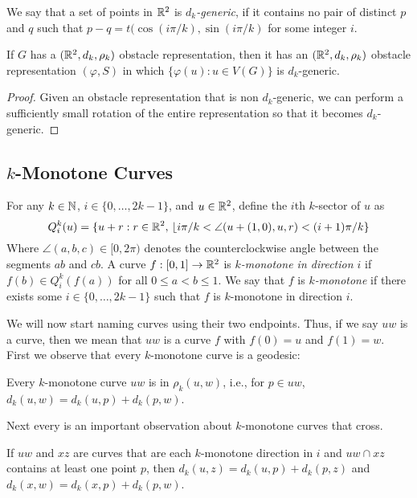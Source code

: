 \documentclass{patmorin}
\begin{document}
We say that a set of points in $\mathbb{R}^2$ is \emph{$d_k$-generic},
if it contains no pair of distinct $p$ and $q$ such that $p-q=
t(\cos(i\pi/k),\sin(i\pi/k)$ for some integer $i$.

\begin{obs}
  If $G$ has a $(\mathbb{R}^2,d_k,\rho_k)$ obstacle representation, then it
  has an $(\mathbb{R}^2,d_k,\rho_k)$ obstacle representation $(\varphi, S)$
  in which $\{\varphi(u):u\in V(G)\}$ is $d_k$-generic.
\end{obs}

\begin{proof}
   Given an obstacle representation that is non $d_k$-generic, we can
   perform a sufficiently small rotation of the entire representation
   so that it becomes $d_k$-generic.
\end{proof}



\subsection{$k$-Monotone Curves}

For any $k\in\mathbb{N}$, $i\in\{0,\ldots,2k-1\}$, and $u\in\mathbb{R}^2$, define the
$i$th $k$-sector of $u$ as
\[
   Q^{k}_i(u) = 
     \{ u+r: r\in\mathbb{R}^2,\,\lfloor i\pi/k < \angle(u+(1,0),u,r) < (i+1)\pi/k \}
\]
Where $\angle (a,b,c)\in[0,2\pi)$ denotes the counterclockwise angle
between the segments $ab$ and $cb$.  A curve $f:[0,1]\to\mathbb{R}^2$ is
\emph{$k$-monotone in direction $i$} if $f(b)\in Q^k_i(f(a))$ for all
$0 \le a < b \le 1$.  We say that $f$ is \emph{$k$-monotone} if there
exists some $i\in\{0,\ldots,2k-1\}$ such that $f$ is $k$-monotone in
direction $i$.  

We will now start naming curves using their two endpoints.  Thus,
if we say $uw$ is a curve, then we mean that $uw$ is a curve $f$ with
$f(0)=u$ and $f(1)=w$.  First we observe that every $k$-monotone curve
is a geodesic:

\begin{obs}
   Every $k$-monotone curve $uw$ is in $\rho_k(u,w)$, i.e., for $p\in
   uw$, $d_k(u,w)=d_k(u,p)+d_k(p,w)$.
\end{obs}

Next every is an important observation about $k$-monotone curves that cross.

\begin{obs}
   If $uw$ and $xz$ are curves that are each $k$-monotone direction in $i$
   and $uw\cap xz$ contains at least one point $p$, then $d_k(u,z) =
   d_k(u,p)+d_k(p,z)$ and $d_k(x,w)=d_k(x,p)+d_k(p,w)$.
\end{obs}
\end{document}
